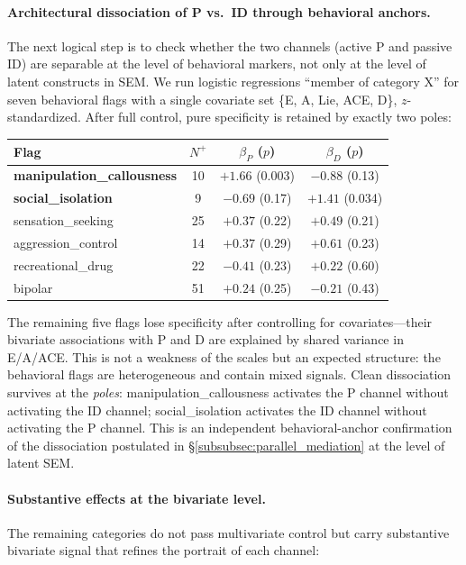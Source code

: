 \paragraph{Architectural dissociation of P vs.\ ID through behavioral anchors.} The next logical step is to check whether the two channels (active P and passive ID) are separable at the level of behavioral markers, not only at the level of latent constructs in SEM. We run logistic regressions ``member of category X'' for seven behavioral flags with a single covariate set \{E, A, Lie, ACE, D\}, $z$-standardized. After full control, pure specificity is retained by exactly two poles:

\begin{center}
\begin{tabular}{lccc}
\toprule
Flag & $N^+$ & $\beta_P$ ($p$) & $\beta_D$ ($p$) \\
\midrule
\textbf{manipulation\_callousness} & 10 & $\mathbf{+1.66}$ (0.003) & $-0.88$ (0.13) \\
\textbf{social\_isolation}          &  9 & $-0.69$ (0.17)          & $\mathbf{+1.41}$ (0.034) \\
sensation\_seeking                 & 25 & $+0.37$ (0.22)          & $+0.49$ (0.21) \\
aggression\_control                & 14 & $+0.37$ (0.29)          & $+0.61$ (0.23) \\
recreational\_drug                 & 22 & $-0.41$ (0.23)          & $+0.22$ (0.60) \\
bipolar                            & 51 & $+0.24$ (0.25)          & $-0.21$ (0.43) \\
\bottomrule
\end{tabular}
\end{center}

The remaining five flags lose specificity after controlling for covariates---their bivariate associations with P and D are explained by shared variance in E/A/ACE. This is not a weakness of the scales but an expected structure: the behavioral flags are heterogeneous and contain mixed signals. Clean dissociation survives at the \emph{poles}: manipulation\_callousness activates the P channel without activating the ID channel; social\_isolation activates the ID channel without activating the P channel. This is an independent behavioral-anchor confirmation of the dissociation postulated in §\ref{subsubsec:parallel_mediation} at the level of latent SEM.

\paragraph{Substantive effects at the bivariate level.} The remaining categories do not pass multivariate control but carry substantive bivariate signal that refines the portrait of each channel:


